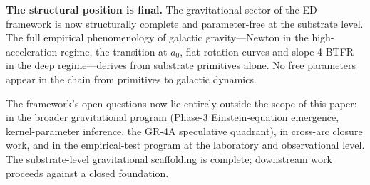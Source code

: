 \documentclass[11pt,a4paper]{article}
\begin{document}
\textbf{The structural position is final.} The gravitational sector of the ED framework is now structurally complete and parameter-free at the substrate level. The full empirical phenomenology of galactic gravity---Newton in the high-acceleration regime, the transition at $a_0$, flat rotation curves and slope-4 BTFR in the deep regime---derives from substrate primitives alone. No free parameters appear in the chain from primitives to galactic dynamics.

The framework's open questions now lie entirely outside the scope of this paper: in the broader gravitational program (Phase-3 Einstein-equation emergence, kernel-parameter inference, the GR-4A speculative quadrant), in cross-arc closure work, and in the empirical-test program at the laboratory and observational level. The substrate-level gravitational scaffolding is complete; downstream work proceeds against a closed foundation.
\end{document}
